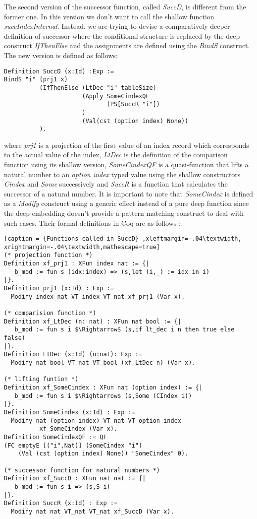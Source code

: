 The second version of the successor function, called \textit{SuccD}, is different from the former one. In this version we don't want to call the shallow function \textit{succIndexInternal}. Instead, we are trying to devise a comparatively deeper definition of successor where the conditional structure is replaced by the deep construct \textit{IfThenElse} and the assignments are defined using the \textit{BindS} construct. The new version is defined as follows: 
\begin{lstlisting}[caption = {Definition of SuccD},label={SuccD}]
Definition SuccD (x:Id) :Exp :=
BindS "i" (prj1 x) 
          (IfThenElse (LtDec "i" tableSize) 
                      (Apply SomeCindexQF
                             (PS[SuccR "i"])
                      ) 
                      (Val(cst (option index) None))
          ).
\end{lstlisting} \vspace{4pt}
where \textit{prj1} is a projection of the first value of an index record which corresponds to the actual value of the index, \textit{LtDec} is the definition of the comparison function using its shallow version, \textit{SomeCindexQF} is a quasi-function that lifts a natural number to an \textit{option index} typed value using the shallow constructors \textit{Cindex} and \textit{Some} successively and \textit{SuccR} is a function that calculates the successor of a natural number. It is important to note that \textit{SomeCindex} is defined as a \textit{Modify} construct using a generic effect instead of a pure deep function since the deep embedding doesn’t provide a pattern matching construct to deal with such cases. Their formal definitions in Coq are as follows :   \pagebreak
\begin{lstlisting}[caption = {Functions called in SuccD} ,xleftmargin=-.04\textwidth,
xrightmargin=-.04\textwidth,mathescape=true]
(* projection function *)
Definition xf_prj1 : XFun index nat := {|
   b_mod := fun s (idx:index) => (s,let (i,_) := idx in i)
|}.
Definition prj1 (x:Id) : Exp :=
  Modify index nat VT_index VT_nat xf_prj1 (Var x). 
  
(* comparision function *)
Definition xf_LtDec (n: nat) : XFun nat bool := {|
   b_mod := fun s i $\Rightarrow$ (s,if lt_dec i n then true else false)
|}.
Definition LtDec (x:Id) (n:nat): Exp :=
  Modify nat bool VT_nat VT_bool (xf_LtDec n) (Var x). 

(* lifting funtion *)
Definition xf_SomeCindex : XFun nat (option index) := {|
   b_mod := fun s i $\Rightarrow$ (s,Some (CIndex i))
|}.
Definition SomeCindex (x:Id) : Exp :=
  Modify nat (option index) VT_nat VT_option_index  
  	      xf_SomeCindex (Var x).
Definition SomeCindexQF := QF 
(FC emptyE [("i",Nat)] (SomeCindex "i") 
    (Val (cst (option index) None)) "SomeCindex" 0).

(* successor function for natural numbers *)
Definition xf_SuccD : XFun nat nat := {|
   b_mod := fun s i => (s,S i)
|}.
Definition SuccR (x:Id) : Exp :=
  Modify nat nat VT_nat VT_nat xf_SuccD (Var x).
\end{lstlisting} \vspace{4pt} 


